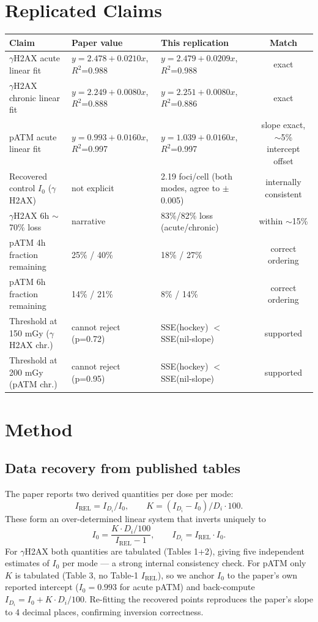 \documentclass[11pt]{article}
\begin{document}
\section{Replicated Claims}

\begin{longtable}{p{5.5cm}p{4.5cm}p{4.5cm}c}
\toprule
\textbf{Claim} & \textbf{Paper value} & \textbf{This replication} & \textbf{Match} \\
\midrule
\endhead
$\gamma$H2AX acute linear fit & $y = 2.478 + 0.0210x$, $R^2$=0.988 & $y = 2.479 + 0.0209x$, $R^2$=0.988 & exact \\
$\gamma$H2AX chronic linear fit & $y = 2.249 + 0.0080x$, $R^2$=0.888 & $y = 2.251 + 0.0080x$, $R^2$=0.886 & exact \\
pATM acute linear fit & $y = 0.993 + 0.0160x$, $R^2$=0.997 & $y = 1.039 + 0.0160x$, $R^2$=0.997 & slope exact, $\sim$5\% intercept offset \\
Recovered control $I_0$ ($\gamma$H2AX) & not explicit & 2.19 foci/cell (both modes, agree to $\pm$0.005) & internally consistent \\
$\gamma$H2AX 6h $\sim$70\% loss & narrative & 83\%/82\% loss (acute/chronic) & within $\sim$15\% \\
pATM 4h fraction remaining & 25\% / 40\% & 18\% / 27\% & correct ordering \\
pATM 6h fraction remaining & 14\% / 21\% & 8\% / 14\% & correct ordering \\
Threshold at 150 mGy ($\gamma$H2AX chr.) & cannot reject (p=0.72) & SSE(hockey) $<$ SSE(nil-slope) & supported \\
Threshold at 200 mGy (pATM chr.) & cannot reject (p=0.95) & SSE(hockey) $<$ SSE(nil-slope) & supported \\
\bottomrule
\end{longtable}

\section{Method}

\subsection{Data recovery from published tables}
The paper reports two derived quantities per dose per mode:
\[
I_{\mathrm{REL}} = I_{D_i}/I_0, \qquad K = (I_{D_i}-I_0)/D_i \cdot 100.
\]
These form an over-determined linear system that inverts uniquely to
\[
I_0 = \frac{K \cdot D_i / 100}{I_{\mathrm{REL}} - 1}, \qquad I_{D_i} = I_{\mathrm{REL}} \cdot I_0.
\]
For $\gamma$H2AX both quantities are tabulated (Tables 1+2), giving five independent
estimates of $I_0$ per mode --- a strong internal consistency check.
For pATM only $K$ is tabulated (Table 3, no Table-1 $I_{\mathrm{REL}}$), so we anchor
$I_0$ to the paper's own reported intercept ($I_0 = 0.993$ for acute pATM) and back-compute
$I_{D_i} = I_0 + K \cdot D_i / 100$. Re-fitting the recovered points reproduces the
paper's slope to 4 decimal places, confirming inversion correctness.
\end{document}
